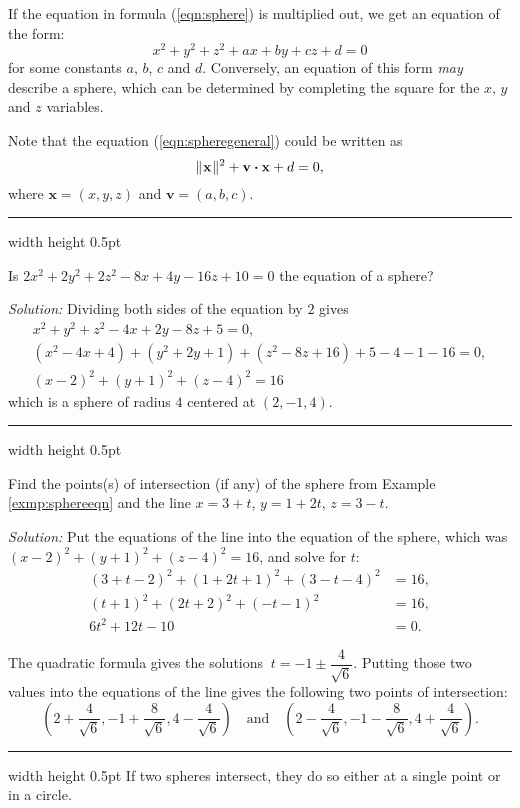 If the equation in formula (\ref{eqn:sphere}) is multiplied out, we get an equation of the form:
\begin{equation}\label{eqn:spheregeneral}
 x^2 + y^2 + z^2 + ax + by + cz + d = 0
\end{equation}
for some constants $a$, $b$, $c$ and $d$. Conversely, an equation of this form
\emph{may} describe a sphere, which can be determined by completing the
square for the $x$, $y$ and $z$ variables.

Note that the equation (\ref{eqn:spheregeneral}) could be written as 
\[\lVert\mspace{1mu}\mathbf{x}\mspace{1mu}\rVert^2+\mathbf{v} \bm{\cdot} \mathbf{x}+d=0,
\]
where $\mathbf{x}=(x,y,z)$ and $\mathbf{v}=(a,b,c)$.

\smallskip
\hrule width \textwidth height 0.5pt
\begin{exmp}\label{exmp:sphereeqn}
 Is $2x^2 + 2y^2 + 2z^2 - 8x + 4y - 16z + 10 = 0$ the equation of a sphere?\smallskip
 \par\noindent\emph{Solution:} Dividing both sides of the equation by $2$ gives
 \begin{gather*}
  x^2 + y^2 + z^2 - 4x + 2y - 8z + 5 = 0,\\
  (x^2 - 4x + 4) + (y^2 + 2y + 1) + (z^2 - 8z + 16) + 5 - 4 - 1 - 16 = 0,\\
  (x - 2)^2 + (y + 1)^2 + (z - 4)^2 = 16
 \end{gather*}
 which is a sphere of radius $4$ centered at $(2,-1,4)$.
\end{exmp}
\hrule width \textwidth height 0.5pt
\begin{exmp}\label{exmp:sphereline}
 Find the points(s) of intersection (if any) of the sphere from Example \ref{exmp:sphereeqn} and the line
 $x = 3 + t$, $y = 1 + 2t$, $z = 3 - t$.
 \smallskip
 \par\noindent\emph{Solution:} Put the equations of the line into the equation of the sphere, which was
 $(x - 2)^2 + (y + 1)^2 + (z - 4)^2 = 16$, and solve for $t$:
 \begin{align*}
  (3 + t - 2)^2 + (1 + 2t + 1)^2 + (3 - t - 4)^2 &= 16,\\
  (t + 1)^2 + (2t + 2)^2 + (-t - 1)^2 &= 16,\\
  6t^2 + 12t -10 &= 0.
 \end{align*}
 \par\noindent The quadratic formula gives the solutions $~t = -1 \pm \dfrac{4}{\sqrt{6}}$. Putting those
 two values into the equations of the line gives the following two points of intersection:
 \begin{displaymath}
  \left( 2 + \frac{4}{\sqrt{6}}, -1 + \frac{8}{\sqrt{6}}, 4 - \frac{4}{\sqrt{6}} \right) \quad \text{and} \quad
  \left( 2 - \frac{4}{\sqrt{6}}, -1 - \frac{8}{\sqrt{6}}, 4 + \frac{4}{\sqrt{6}} \right).
 \end{displaymath}
\end{exmp}
\hrule width \textwidth height 0.5pt
\pagebreak[3]
If two spheres intersect, they do so either at a single point or in a circle.

